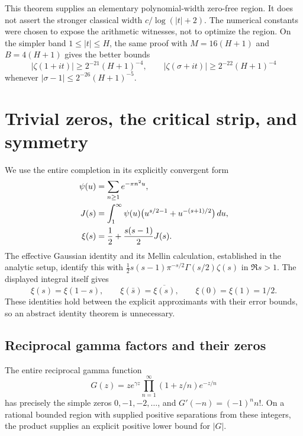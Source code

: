 This theorem supplies an elementary polynomial-width zero-free region.
It does not assert the stronger classical width $c/\log(|t|+2)$.
The numerical constants were chosen to expose the arithmetic witnesses,
not to optimize the region.  On the simpler band $1\le|t|\le H$, the
same proof with $M=16(H+1)$ and $B=4(H+1)$ gives the better bounds
\[
 |\zeta(1+it)|\ge2^{-21}(H+1)^{-4},\qquad
 |\zeta(\sigma+it)|\ge2^{-22}(H+1)^{-4}
\]
whenever $|\sigma-1|\le2^{-26}(H+1)^{-5}$.

\section{Trivial zeros, the critical strip, and symmetry}
\label{sec:elementary-location}

We use the entire completion in its explicitly convergent form
\begin{align}
 \psi(u)&=\sum_{n\ge1}e^{-\pi n^2u},\notag\\
 J(s)&=\int_1^\infty\psi(u)
       \bigl(u^{s/2-1}+u^{-(s+1)/2}\bigr)\,du,\notag\\
 \xi(s)&=\frac12+\frac{s(s-1)}2J(s).
 \label{eq:elem-xi-integral}
\end{align}
The effective Gaussian identity and its Mellin calculation, established
in the analytic setup, identify this with
$\tfrac12s(s-1)\pi^{-s/2}\Gamma(s/2)\zeta(s)$ in $\Re s>1$.
The displayed integral itself gives
\begin{equation}
 \xi(s)=\xi(1-s),\qquad
 \xi(\bar s)=\overline{\xi(s)},\qquad
 \xi(0)=\xi(1)=1/2.
 \label{eq:elem-xi-symmetries}
\end{equation}
These identities hold between the explicit approximants with their
error bounds, so an abstract identity theorem is unnecessary.

\subsection{Reciprocal gamma factors and their zeros}

\begin{lemma}
\label{lem:elem-gamma}
The entire reciprocal gamma function
\begin{equation}
 G(z)=z e^{\gamma z}\prod_{n=1}^\infty(1+z/n)e^{-z/n}
 \label{eq:elem-gamma-product}
\end{equation}
has precisely the simple zeros $0,-1,-2,\ldots$, and
$G'(-n)=(-1)^n n!$.  On a rational bounded region with supplied positive
separations from these integers, the product supplies an explicit
positive lower bound for $|G|$.
\end{lemma}

